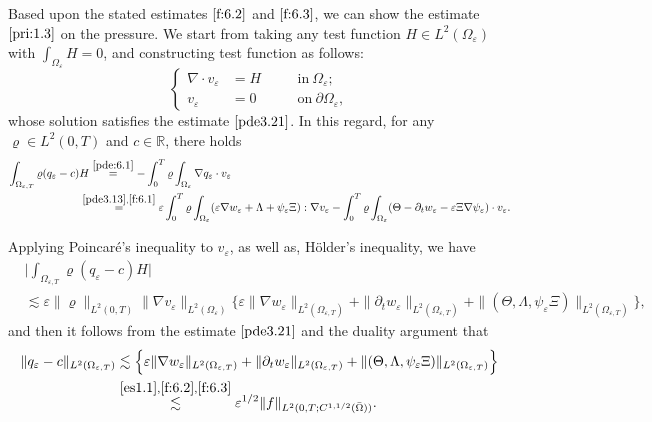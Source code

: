 \documentclass[13pt,CJK]{article}
\theoremstyle{plain}                       %
\theoremstyle{remark}
\numberwithin{equation}{section}
\begin{document}
Based upon the stated estimates $\eqref{f:6.2}$ and
$\eqref{f:6.3}$, we can show the estimate $\eqref{pri:1.3}$ on the pressure.
We start from taking any test function $H\in L^2(\Omega_\varepsilon)$ with
$\int_{\Omega_\varepsilon}H=0$, and constructing test function as follows:
\begin{equation}\label{pde:6.1}
\left\{\begin{aligned}
\nabla\cdot v_\varepsilon &=  H &\quad&\text{in}~\Omega_{\varepsilon};\\
v_\varepsilon &= 0 &\quad&\text{on}~\partial\Omega_{\varepsilon},
\end{aligned}\right.
\end{equation}
whose solution satisfies the estimate $\eqref{pde3.21}$.
In this regard, for any $\varrho\in L^2(0,T)$ and $c\in\mathbb{R}$, there holds
\begin{equation*}
\begin{aligned}
 \int_{\Omega_{\varepsilon,T}}
 \varrho(q_\varepsilon-c)
 &H
 \overset{\eqref{pde:6.1}}{=} -\int_{0}^{T}\varrho \int_{\Omega_{\varepsilon}}\nabla q_\varepsilon\cdot v_\varepsilon \\
 &\overset{\eqref{pde3.13},\eqref{f:6.1}}{=} \varepsilon
 \int_{0}^{T}\varrho\int_{\Omega_\varepsilon}
 (\varepsilon\nabla w_\varepsilon+\Lambda+\psi_\varepsilon\Xi):\nabla v_\varepsilon
 -\int_{0}^{T}\varrho\int_{\Omega_\varepsilon}
 (\Theta-\partial_tw_\varepsilon -\varepsilon\Xi\nabla\psi_\varepsilon)\cdot v_\varepsilon.
\end{aligned}
\end{equation*}

Applying Poincar\'e's inequality to $v_\varepsilon$, as well as, H\"older's inequality, we have
\begin{equation*}
\begin{aligned}
&\big|\int_{\Omega_{\varepsilon,T}}\varrho(q_\varepsilon-c)H\big|\\
&\lesssim \varepsilon\|\varrho\|_{L^2(0,T)}\|\nabla v_\varepsilon\|_{L^2(\Omega_\varepsilon)}
\Big\{\varepsilon\|\nabla w_\varepsilon\|_{L^2(\Omega_{\varepsilon,T})}
+\|\partial_t w_\varepsilon\|_{L^2(\Omega_{\varepsilon,T})}
+\|(\Theta,\Lambda,\psi_\varepsilon\Xi)\|_{L^2(\Omega_{\varepsilon,T})}\Big\},
\end{aligned}
\end{equation*}
and then it follows from the estimate $\eqref{pde3.21}$ and the duality argument that
\begin{equation*}
\begin{aligned}
\|q_\varepsilon-c\|_{L^2(\Omega_{\varepsilon,T})}
&\lesssim \Big\{\varepsilon\|\nabla w_\varepsilon\|_{L^2(\Omega_{\varepsilon,T})}
+\|\partial_t w_\varepsilon\|_{L^2(\Omega_{\varepsilon,T})}
+\|(\Theta,\Lambda,\psi_\varepsilon\Xi)\|_{L^2(\Omega_{\varepsilon,T})}\Big\}\\
&\overset{\eqref{es1.1},\eqref{f:6.2},\eqref{f:6.3}}{\lesssim} \varepsilon^{1/2}\|f\|_{L^2(0,T;C^{1,1/2}(\bar\Omega))}.
\end{aligned}
\end{equation*}
\end{document}
